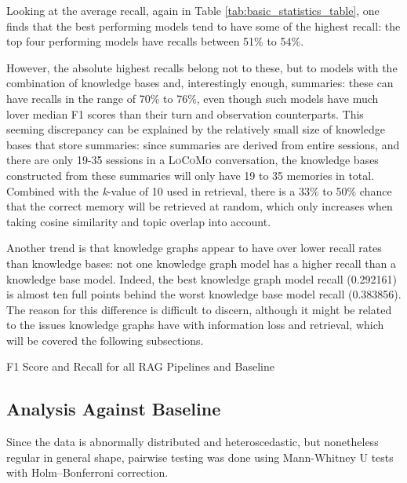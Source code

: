 Looking at the average recall, again in Table \ref{tab:basic_statistics_table}, one finds that the best performing models tend to have some of the highest recall: the top four performing models have recalls between 51\% to 54\%. 

However, the absolute highest recalls belong not to these, but to models with the combination of knowledge bases and, interestingly enough, summaries: these can have recalls in the range of 70\% to 76\%, even though such models have much lover median F1 scores than their turn and observation counterparts. This seeming discrepancy can be explained by the relatively small size of knowledge bases that store summaries: since summaries are derived from entire sessions, and there are only 19-35 sessions in a \textsc{LoCoMo} conversation, the knowledge bases constructed from these summaries will only have 19 to 35 memories in total. Combined with the \textit{k}-value of 10 used in retrieval, there is a 33\% to 50\% chance that the correct memory will be retrieved at random, which only increases when taking cosine similarity and topic overlap into account.

Another trend is that knowledge graphs appear to have over lower recall rates than knowledge bases: not one knowledge graph model has a higher recall than a knowledge base model. Indeed, the best knowledge graph model recall (0.292161) is almost ten full points behind the worst knowledge base model recall (0.383856). The reason for this difference is difficult to discern, although it might be related to the issues knowledge graphs have with information loss and retrieval, which will be covered the following subsections.

\begin{table}[htbp]
\centering
\scriptsize

\caption{F1 Score and Recall for all RAG Pipelines and Baseline}
\label{tab:basic_statistics_table}
\end{table}



\subsection{Analysis Against Baseline}

Since the data is abnormally distributed and heteroscedastic, but nonetheless regular in general shape, pairwise testing was done using Mann-Whitney U tests with Holm–Bonferroni correction.

